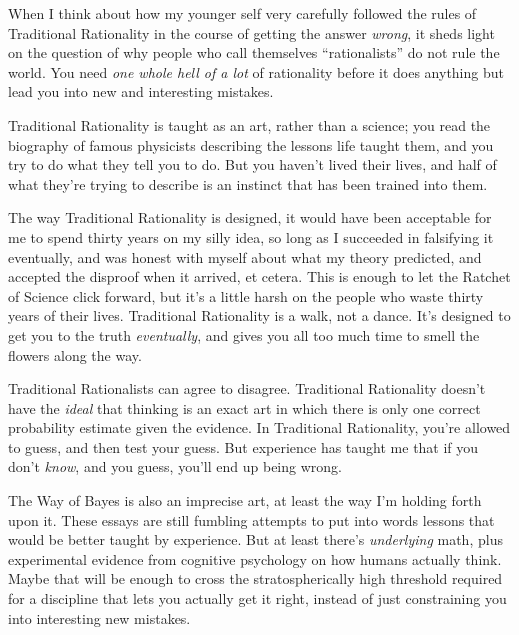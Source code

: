 {
 When I think about how my younger self very carefully followed the
rules of Traditional Rationality in the course of getting the answer
\textit{wrong}, it sheds light on the question of why people who call
themselves ``rationalists'' do not
rule the world. You need \textit{one whole hell of a lot} of
rationality before it does anything but lead you into new and
interesting mistakes.}

{
 Traditional Rationality is taught as an art, rather than a
science; you read the biography of famous physicists describing the
lessons life taught them, and you try to do what they tell you to do.
But you haven't lived their lives, and half of what
they're trying to describe is an instinct that has been
trained into them.}

{
 The way Traditional Rationality is designed, it would have been
acceptable for me to spend thirty years on my silly idea, so long as I
succeeded in falsifying it eventually, and was honest with myself about
what my theory predicted, and accepted the disproof when it arrived, et
cetera. This is enough to let the Ratchet of Science click forward, but
it's a little harsh on the people who waste thirty
years of their lives. Traditional Rationality is a walk, not a dance.
It's designed to get you to the truth
\textit{eventually}, and gives you all too much time to smell the
flowers along the way.}

{
 Traditional Rationalists can agree to disagree. Traditional
Rationality doesn't have the \textit{ideal} that
thinking is an exact art in which there is only one correct probability
estimate given the evidence. In Traditional Rationality,
you're allowed to guess, and then test your guess. But
experience has taught me that if you don't
\textit{know}, and you guess, you'll end up being
wrong.}

{
 The Way of Bayes is also an imprecise art, at least the way
I'm holding forth upon it. These essays are still
fumbling attempts to put into words lessons that would be better taught
by experience. But at least there's \textit{underlying}
math, plus experimental evidence from cognitive psychology on how
humans actually think. Maybe that will be enough to cross the
stratospherically high threshold required for a discipline that lets
you actually get it right, instead of just constraining you into
interesting new mistakes.}

\myendsectiontext


